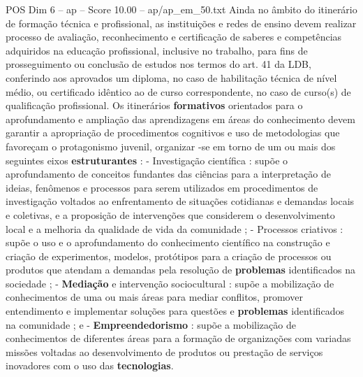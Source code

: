 \begin{textsample}{POS Dim 6 – ap – Score 10.00 – ap/ap\_em\_50.txt}
Ainda no âmbito do itinerário de formação técnica e profissional, as instituições e redes de ensino devem realizar processo de avaliação, reconhecimento e certificação de saberes e competências adquiridos na educação profissional, inclusive no trabalho, para fins de prosseguimento ou conclusão de estudos nos termos do art. 41 da LDB, conferindo aos aprovados um diploma, no caso de habilitação técnica de nível médio, ou certificado idêntico ao de curso correspondente, no caso de curso(s) de qualificação profissional.
Os itinerários \textbf{formativos} orientados para o aprofundamento e ampliação das aprendizagens em áreas do conhecimento devem garantir a apropriação de procedimentos cognitivos e uso de metodologias que favoreçam o protagonismo juvenil, organizar -se em torno de um ou mais dos seguintes eixos \textbf{estruturantes} : - Investigação científica : supõe o aprofundamento de conceitos fundantes das ciências para a interpretação de ideias, fenômenos e processos para serem utilizados em procedimentos de investigação voltados ao enfrentamento de situações cotidianas e demandas locais e coletivas, e a proposição de intervenções que considerem o desenvolvimento local e a melhoria da qualidade de vida da comunidade ; - Processos criativos : supõe o uso e o aprofundamento do conhecimento científico na construção e criação de experimentos, modelos, protótipos para a criação de processos ou produtos que atendam a demandas pela resolução de \textbf{problemas} identificados na sociedade ; - \textbf{Mediação} e intervenção sociocultural : supõe a mobilização de conhecimentos de uma ou mais áreas para mediar conflitos, promover entendimento e implementar soluções para questões e \textbf{problemas} identificados na comunidade ; e - \textbf{Empreendedorismo} : supõe a mobilização de conhecimentos de diferentes áreas para a formação de organizações com variadas missões voltadas ao desenvolvimento de produtos ou prestação de serviços inovadores com o uso das \textbf{tecnologias}.

\end{textsample}
